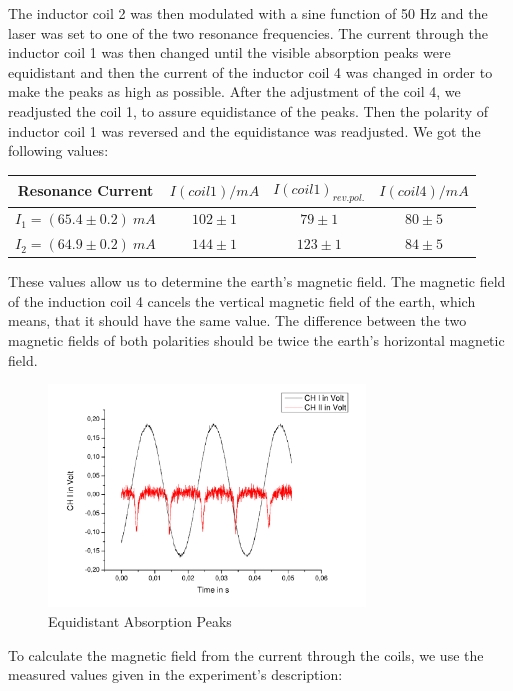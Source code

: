 The inductor coil 2 was then modulated with a sine function of 50 Hz and the laser was set to one of the two resonance frequencies. The current through the inductor coil 1 was then changed until the visible absorption peaks were equidistant and then the current of the inductor coil 4 was changed in order to make the peaks as high as possible. After the adjustment of the coil 4, we readjusted the coil 1, to assure equidistance of the peaks. Then the polarity of inductor coil 1 was reversed and the equidistance was readjusted. We got the following values:

\begin{center}
\begin{tabular}[H]{c | c c c}
Resonance Current & $I(coil1)/mA$ & $I(coil1)_{rev.pol.}$ & $I(coil4)/mA$ \\ \hline
$I_1 = (65.4 \pm 0.2)\ mA$ & $102 \pm 1$ & $79 \pm 1$ & $80 \pm 5$ \\
$I_2 = (64.9 \pm 0.2 )\ mA$ & $144 \pm 1$ & $123\pm1$ & $84\pm5$ \\
\end{tabular}
\end{center}

These values allow us to determine the earth's magnetic field. The magnetic field of the induction coil 4 cancels the vertical magnetic field of the earth, which means, that it should have the same value. The difference between the two magnetic fields of both polarities should be twice the earth's horizontal magnetic field.\\

\begin{figure}[H]
\centering \includegraphics[width=0.75\textwidth]{BilderAusw/DRequi.pdf}
\caption{Equidistant Absorption Peaks}
\end{figure}


To calculate the magnetic field from the current through the coils, we use the measured values given in the experiment's description:

